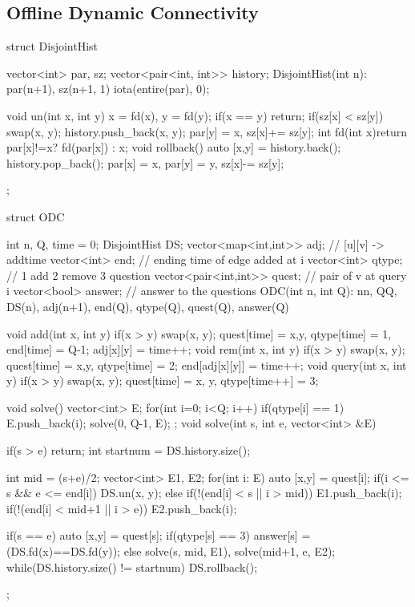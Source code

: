 \subsection{Offline Dynamic Connectivity}
\begin{cpp}
struct DisjointHist{
  vector<int> par, sz;
  vector<pair<int, int>> history;
  DisjointHist(int n): par(n+1), sz(n+1, 1)
    {iota(entire(par), 0);}

  void un(int x, int y){
    x = fd(x), y = fd(y);
    if(x == y) return;
    if(sz[x] < sz[y]) swap(x, y);
    history.push_back({x, y});
    par[y] = x, sz[x]+= sz[y];
  }
  int fd(int x){return par[x]!=x? fd(par[x]) : x;}
  void rollback(){
    auto [x,y] = history.back(); history.pop_back();
    par[x] = x, par[y] = y, sz[x]-= sz[y];
  }
};

struct ODC{
  int n, Q, time = 0;
  DisjointHist DS;
  vector<map<int,int>> adj; // [u][v] -> addtime
  vector<int> end; // ending time of edge added at i
  vector<int> qtype; // 1 add 2 remove 3 question
  vector<pair<int,int>> quest; // pair of v at query i
  vector<bool> answer; // answer to the questions
  ODC(int n, int Q): n{n}, Q{Q}, DS(n), adj(n+1),
    end(Q), qtype(Q), quest(Q), answer(Q) {}

  void add(int x, int y){
    if(x > y) swap(x, y);
    quest[time] = {x,y}, qtype[time] = 1, end[time] = Q-1;
    adj[x][y] = time++;
  }
  void rem(int x, int y){
    if(x > y) swap(x, y);
    quest[time] = {x,y}, qtype[time] = 2;
    end[adj[x][y]] = time++;
  }
  void query(int x, int y){
    if(x > y) swap(x, y);
    quest[time] = {x, y}, qtype[time++] = 3;
  }

  void solve(){
    vector<int> E;
    for(int i=0; i<Q; i++) if(qtype[i] == 1) 
      E.push_back(i);
    solve(0, Q-1, E);
  };
  void solve(int s, int e, vector<int> &E){
    if(s > e) return;
    int startnum = DS.history.size();

    int mid = (s+e)/2;
    vector<int> E1, E2;
    for(int i: E){
      auto [x,y] = quest[i];
      if(i <= s && e <= end[i]) DS.un(x, y);
      else{
        if(!(end[i] < s || i > mid)) E1.push_back(i);
        if(!(end[i] < mid+1 || i > e)) E2.push_back(i);
      }
    }

    if(s == e){
      auto [x,y] = quest[s];
      if(qtype[s] == 3) answer[s] = (DS.fd(x)==DS.fd(y));
    }
    else solve(s, mid, E1), solve(mid+1, e, E2);
    while(DS.history.size() != startnum) DS.rollback();
  }
};
\end{cpp}